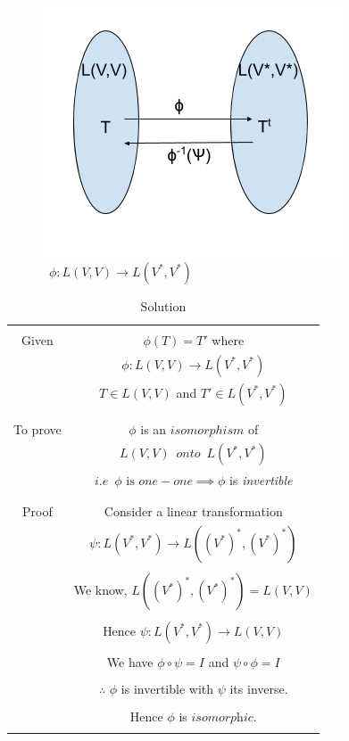 \begin{figure}[!ht]
\centering
\includegraphics[width=\columnwidth]{solutions/3/7/7/fig/transpose.png}
\caption{$\enspace \phi : L(V,V) \rightarrow L(V^*,V^*)$}
\end{figure}
\begin{table}[!ht]
\begin{center}
\begin{tabular}{|c|c|}
\hline
& \\
Given & $\phi(T) = T'$ where\\
& $\phi : L(V,V) \rightarrow L(V^*,V^*)$\\
& $T \in L(V,V)$ and $T' \in L(V^*,V^*)$\\
& \\
\hline
& \\
To prove & $\phi$ is an $isomorphism$ of\\
& $L(V,V) \enspace onto \enspace L(V^*,V^*)$\\
& $i.e \enspace \phi \text{ is } one-one \implies \phi$ is \textit{invertible}\\
& \\ 
\hline
& \\
Proof & Consider a linear transformation\\
& $\psi : L(V^*,V^*) \rightarrow L((V^*)^*,(V^*)^*)$\\
& \\
& We know, $L((V^*)^*,(V^*)^*) = L(V,V)$\\
& \\
& Hence $\psi : L(V^*,V^*) \rightarrow L(V,V)$\\
& \\
& We have $\phi \circ \psi = I$ and $\psi \circ \phi = I$\\
& \\
& $\therefore$ $\phi$ is invertible with $\psi$ its inverse.\\
& \\
& Hence $\phi$ is $\textit{isomorphic}$.\\
& \\
\hline
\end{tabular}
\end{center}
\caption{Solution}
\label{eq:solutions/3/7/7/table:2}\end{table}

